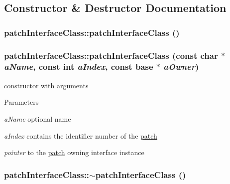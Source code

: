 \subsection{Constructor \& Destructor Documentation}
\hypertarget{classpatch_interface_class_a04b02c1b6c3c98fb1d1d85a3b7d3a566}{
\subsubsection[{patchInterfaceClass}]{\setlength{\rightskip}{0pt plus 5cm}patchInterfaceClass::patchInterfaceClass ()}}
\label{classpatch_interface_class_a04b02c1b6c3c98fb1d1d85a3b7d3a566}
\hypertarget{classpatch_interface_class_a2bee0718790d4edd769f1dab8df3ebf5}{
\subsubsection[{patchInterfaceClass}]{\setlength{\rightskip}{0pt plus 5cm}patchInterfaceClass::patchInterfaceClass (const char $\ast$ {\em aName}, \/  const int {\em aIndex}, \/  const {\bf base} $\ast$ {\em aOwner})}}
\label{classpatch_interface_class_a2bee0718790d4edd769f1dab8df3ebf5}


constructor with arguments 
\begin{DoxyParams}{Parameters}
\item[{\em aName}]optional name \item[{\em aIndex}]contains the identifier number of the \hyperlink{classpatch}{patch} \item[{\em pointer}]to the \hyperlink{classpatch}{patch} owning interface instance \end{DoxyParams}
\hypertarget{classpatch_interface_class_ad2e74958a38f300d12258ca63549e1db}{
\subsubsection[{$\sim$patchInterfaceClass}]{\setlength{\rightskip}{0pt plus 5cm}patchInterfaceClass::$\sim$patchInterfaceClass ()}}
\label{classpatch_interface_class_ad2e74958a38f300d12258ca63549e1db}


